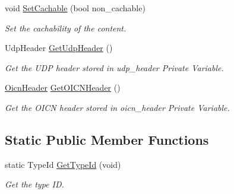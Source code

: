 \begin{DoxyCompactItemize}
void \hyperlink{classns3_1_1SublayerProtocol_ad875af270446269baf99bcaebad48139}{Set\-Cachable} (bool non\-\_\-cachable)
\begin{DoxyCompactList}\small\item\em Set the cachability of the content. \end{DoxyCompactList}\item 
Udp\-Header \hyperlink{classns3_1_1SublayerProtocol_a8fd400667ad5ebdbdfd5d36bf7e592ab}{Get\-Udp\-Header} ()
\begin{DoxyCompactList}\small\item\em Get the U\-D\-P header stored in udp\-\_\-header Private Variable. \end{DoxyCompactList}\item 
\hyperlink{classns3_1_1OicnHeader}{Oicn\-Header} \hyperlink{classns3_1_1SublayerProtocol_a8499790a430e0db48c3117e25f8d42f2}{Get\-O\-I\-C\-N\-Header} ()
\begin{DoxyCompactList}\small\item\em Get the O\-I\-C\-N header stored in oicn\-\_\-header Private Variable. \end{DoxyCompactList}\end{DoxyCompactItemize}
\subsection*{Static Public Member Functions}
\begin{DoxyCompactItemize}
\item 
static Type\-Id \hyperlink{classns3_1_1SublayerProtocol_a98232c65e445399926f5f0cf7b566944}{Get\-Type\-Id} (void)
\begin{DoxyCompactList}\small\item\em Get the type I\-D. \end{DoxyCompactList}\end{DoxyCompactItemize}
